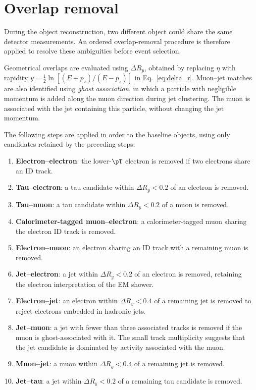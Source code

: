 \section{Overlap removal}
\label{sec:ch6_overlap}

During the object reconstruction, two different object could share the same detector measurements.
An ordered overlap-removal procedure is therefore applied to resolve these ambiguities before event selection.

Geometrical overlaps are evaluated using $\Delta R_y$, obtained by replacing $\eta$ with rapidity $y=\tfrac{1}{2}\ln[(E+p_z)/(E-p_z)]$ in Eq.~\eqref{eq:delta_r}.
Muon--jet matches are also identified using \emph{ghost association}, in which a particle with negligible momentum is added along the muon direction during jet clustering.
The muon is associated with the jet containing this particle, without changing the jet momentum.

The following steps are applied in order to the baseline objects, using only candidates retained by the preceding steps:
\begin{enumerate}
    \item \textbf{Electron--electron}: the lower-$\pT$ electron is removed if two electrons share an ID track.
    \item \textbf{Tau--electron}: a tau candidate within $\Delta R_y<0.2$ of an electron is removed.
    \item \textbf{Tau--muon}: a tau candidate within $\Delta R_y<0.2$ of a muon is removed.
    \item \textbf{Calorimeter-tagged muon--electron}: a calorimeter-tagged muon sharing the electron ID track is removed.
    \item \textbf{Electron--muon}: an electron sharing an ID track with a remaining muon is removed.
    \item \textbf{Jet--electron}: a jet within $\Delta R_y<0.2$ of an electron is removed, retaining the electron interpretation of the EM shower.
    \item \textbf{Electron--jet}: an electron within $\Delta R_y<0.4$ of a remaining jet is removed to reject electrons embedded in hadronic jets.
    \item \textbf{Jet--muon}: a jet with fewer than three associated tracks is removed if the muon is ghost-associated with it. The small track multiplicity suggests that the jet candidate is dominated by activity associated with the muon.
    \item \textbf{Muon--jet}: a muon within $\Delta R_y<0.4$ of a remaining jet is removed.
    \item \textbf{Jet--tau}: a jet within $\Delta R_y<0.2$ of a remaining tau candidate is removed.
\end{enumerate}

